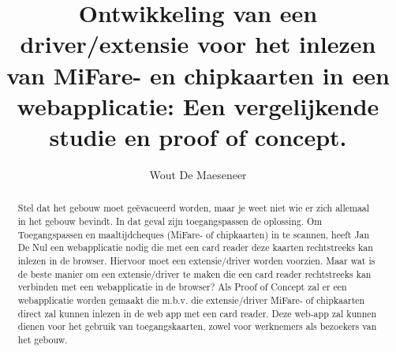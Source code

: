 \documentclass{hogent-article}
\title{Ontwikkeling van een driver/extensie voor het inlezen van MiFare- en chipkaarten in een webapplicatie: Een vergelijkende studie en proof of concept.}
\author{Wout De Maeseneer}
\begin{document}
    
    \begin{abstract}
        Stel dat het gebouw moet geëvacueerd worden, maar je weet niet wie er zich allemaal in het gebouw bevindt. In dat geval zijn toegangspassen de oplossing.
        Om Toegangspassen en maaltijdcheques (MiFare- of chipkaarten) in te scannen, heeft Jan De Nul een webapplicatie nodig die met een card reader deze kaarten rechtstreeks kan inlezen in de browser. Hiervoor moet een extensie/driver worden voorzien.
        Maar wat is de beste manier om een extensie/driver te maken die een card reader rechtstreeks kan verbinden met een webapplicatie in de browser?
        Als Proof of Concept zal er een webapplicatie worden gemaakt die m.b.v. die extensie/driver MiFare- of chipkaarten direct zal kunnen inlezen in de web app met een card reader. Deze web-app zal kunnen dienen voor het gebruik van toegangskaarten, zowel voor werknemers als bezoekers van het gebouw.
    \end{abstract}
    
    \tableofcontents
    
    
    
    \printbibliography[heading=bibintoc]
    
    
\end{document}
